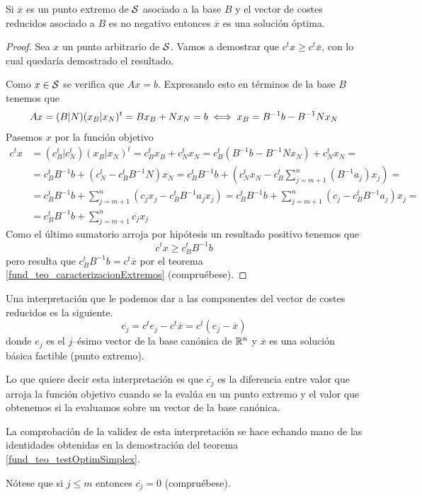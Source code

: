 \begin{theo}
	\label{fund_teo_testOptimSimplex}
	Si $\overline{x}$ es un punto extremo de $\mathcal{S}$ asociado a la base $B$ y el vector de costes reducidos asociado a $B$ es no negativo entonces $\overline{x}$ es una solución óptima.
\end{theo}
\begin{proof}
	Sea $x$ un punto arbitrario de $\mathcal{S}$. Vamos a demostrar que $c^tx\geq c^t\overline{x}$, con lo cual quedaría demostrado el resultado.
	
	Como $x\in \mathcal{S}$ se verifica que $Ax=b$. Expresando esto en términos de la base $B$ tenemos que
	\begin{equation}
	\label{fund_eq_problema}
		Ax=(B|N)(x_B|x_N)^t=Bx_B+Nx_N=b\iff x_B=B^{-1}b-B^{-1}Nx_N
	\end{equation}
	Pasemos $x$ por la función objetivo
	\begin{align}
		\label{fund_eq_funcionObj}
		c^tx&=(c_{B}^t|c_N^t)(x_B|x_N)^t=c_B^tx_B+c_N^tx_N=c_B^t(B^{-1}b-B^{-1}Nx_N)+c_N^tx_N=\nonumber\\
		&=c_B^tB^{-1}b+(c_N^t-c_B^tB^{-1}N)x_N=c_B^tB^{-1}b+\left(c_N^tx_N-c_B^t\sum_{j=m+1}^{n}(B^{-1}a_j)x_j\right)=\nonumber\\
		&=c_B^tB^{-1}b+\sum_{j=m+1}^{n}(c_jx_j-c_B^tB^{-1}a_jx_j)=c_B^tB^{-1}b+\sum_{j=m+1}^{n}(c_j-c_B^tB^{-1}a_j)x_j=\nonumber\\
		&=c_B^tB^{-1}b+\sum_{j=m+1}^{n}\overline{c_j}x_j
	\end{align}
	Como el último sumatorio arroja por hipótesis un resultado positivo tenemos que
	\begin{equation*}
		c^tx\geq c_B^tB^{-1}b
	\end{equation*}
	pero resulta que $c_B^tB^{-1}b=c^t\overline{x}$ por el teorema \ref{fund_teo_caracterizacionExtremos} (compruébese). 
\end{proof}
\begin{obs}
	Una interpretación que le podemos dar a las componentes del vector de costes reducidos es la siguiente.
	\begin{equation*}
		\overline{c_j}=c^te_j-c^t\overline{x}=c^t(e_j-\overline{x})
	\end{equation*}
	donde $e_j$ es el $j$--ésimo vector de la base canónica de $\mathbb{R}^n$ y $\overline{x}$ es una solución básica factible (punto extremo).
	
	Lo que quiere decir esta interpretación es que $\overline{c_j}$ es la diferencia entre valor que arroja la función objetivo cuando se la evalúa en un punto extremo y el valor que obtenemos si la evaluamos sobre un vector de la base canónica.
	
	La comprobación de la validez de esta interpretación se hace echando mano de las identidades obtenidas en la demostración del teorema \ref{fund_teo_testOptimSimplex}.
	
	Nótese que si $j\leq m$ entonces $\overline{c_j}=0$ (compruébese).
\end{obs}
